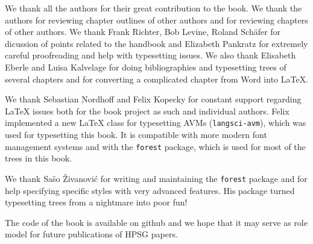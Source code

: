 \begin{refsection}
We thank all the authors for their great contribution to the book. We thank the authors for
reviewing chapter outlines of other authors and for reviewing chapters of other authors. We thank
Frank Richter, Bob Levine, Roland Schäfer for dicussion of points related to the handbook and
Elizabeth Pankratz for extremely careful proofreading and help with typesetting issues. We also
thank Elisabeth Eberle and Luisa Kalvelage for doing bibliographies and typesetting trees of several
chapters and for converting a complicated chapter from Word into \LaTeX.

We thank Sebastian Nordhoff and Felix Kopecky for constant support regarding \LaTeX{} issues both for
the book project as such and individual authors. Felix implemented a new \LaTeX{} class for
typesetting AVMs (\texttt{langsci-avm}), which was used for typesetting this book. It is compatible with more
modern font management systems and with the \texttt{forest} package, which is used for most of the trees in this book.

We thank Sašo Živanović for writing and maintaining the \texttt{forest} package and for help
specifying specific styles with very advanced features. His package turned typesetting trees from a
nightmare into poor fun!

The code of the book is available on github and we hope that it may serve as role model for future
publications of HPSG papers.


\printbibliography[heading=subbibliography]
\end{refsection}

